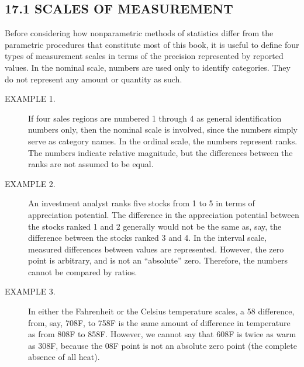 \subsection{17.1 SCALES OF MEASUREMENT}
Before considering how nonparametric methods of statistics differ from the parametric procedures that
constitute most of this book, it is useful to define four types of measurement scales in terms of the precision
represented by reported values.
In the nominal scale, numbers are used only to identify categories. They do not represent any amount or
quantity as such.
\begin{description}
\item[EXAMPLE 1.] If four sales regions are numbered 1 through 4 as general identification numbers only, then the nominal
scale is involved, since the numbers simply serve as category names.
In the ordinal scale, the numbers represent ranks. The numbers indicate relative magnitude, but the
differences between the ranks are not assumed to be equal.
\item[EXAMPLE 2.] An investment analyst ranks five stocks from 1 to 5 in terms of appreciation potential. The difference in the
appreciation potential between the stocks ranked 1 and 2 generally would not be the same as, say, the difference between the
stocks ranked 3 and 4.
In the interval scale, measured differences between values are represented. However, the zero point is
arbitrary, and is not an “absolute” zero. Therefore, the numbers cannot be compared by ratios.
\item[EXAMPLE 3.] In either the Fahrenheit or the Celsius temperature scales, a 58 difference, from, say, 708F, to 758F is the
same amount of difference in temperature as from 808F to 858F. However, we cannot say that 608F is twice as warm as 308F,
because the 08F point is not an absolute zero point (the complete absence of all heat).
\end{description}

